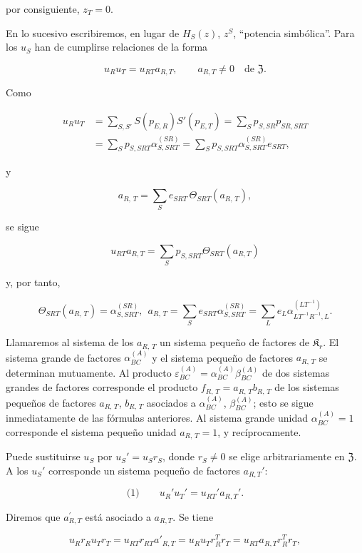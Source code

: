 por consiguiente, \(z_T=0\).

En lo sucesivo escribiremos, en lugar de \(H_S(z)\), \(z^S\), ``potencia simbólica''. Para los \(u_S\) han de cumplirse relaciones de la forma

\[
u_Ru_T=u_{RT}a_{R,T},\qquad a_{R,T}\ne0\quad\text{de }\mathfrak Z.
\]

Como

\[
\begin{aligned}
u_Ru_T
&=\sum_{S,S'} S(p_{E,R})S'(p_{E,T})
=\sum_S p_{S,SR}p_{SR,SRT}\\
&=\sum_S p_{S,SRT}\alpha_{S,SRT}^{(SR)}
=\sum_S p_{S,SRT}\alpha_{S,SRT}^{(SR)}e_{SRT},
\end{aligned}
\]

y

\[a_{R,\,T} = \sum\limits_{S} e_{SRT}\, \Theta_{SRT} \left(a_{R,\,T}\right),\]

se sigue

\[u_{RT} a_{R,T} = \sum\limits_{S} p_{S,SRT} \Theta_{SRT} (a_{R,T})\]

y, por tanto,

\[\Theta_{SRT}(a_{R,\,T}) = \alpha_{S,SRT}^{(SR)}, ~~ a_{R,\,T} = \sum\limits_{S} e_{SRT} \alpha_{S,SRT}^{(SR)} = \sum\limits_{L} e_{L} \alpha_{LT^{-1}R^{-1},L}^{(LT^{-1})}.\]

Llamaremos al sistema de los \(a_{R,\,T}\) un sistema pequeño de factores de \(\mathfrak K_r\). El sistema grande de factores \(\alpha_{BC}^{(A)}\) y el sistema pequeño de factores \(a_{R,\,T}\) se determinan mutuamente. Al producto \(\varepsilon_{BC}^{(A)} = \alpha_{BC}^{(A)} \beta_{BC}^{(A)}\) de dos sistemas grandes de factores corresponde el producto \(f_{R,\,T} = a_{R,\,T}b_{R,\,T}\) de los sistemas pequeños de factores \(a_{R,\,T}\), \(b_{R,\,T}\) asociados a \(\alpha_{BC}^{(A)}\), \(\beta_{BC}^{(A)}\); esto se sigue inmediatamente de las fórmulas anteriores. Al sistema grande unidad \(\alpha_{BC}^{(A)} = 1\) corresponde el sistema pequeño unidad \(a_{R,\,T} = 1\), y recíprocamente.

Puede sustituirse \(u_S\) por \(u_S'=u_Sr_S\), donde \(r_S\neq 0\) se elige arbitrariamente en \(\mathfrak Z\). A los \(u_S'\) corresponde un sistema pequeño de factores \(a_{R,T}'\):

\[
\text{(1)}\qquad u_R'u_T'=u_{RT}'a_{R,T}'.
\]

Diremos que \(a_{R,T}^{\prime}\) está asociado a \(a_{R,T}\). Se tiene

\[u_R r_R u_T r_T = u_{RT} r_{RT} a'_{R,T} = u_R u_T r_R^T r_T = u_{RT} a_{R,T} r_R^T r_T,\]

